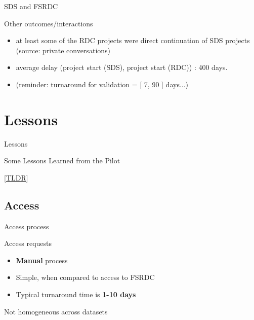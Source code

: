 \begin{frame}{SDS and FSRDC}
\begin{block}{Other outcomes/interactions}
\begin{itemize}
	\item at least some of the RDC projects were
direct continuation of SDS projects%
 (source: private conversations)
	\item average delay (project start (SDS), project start (RDC)) : 400 days.
	\item (reminder:  turnaround for validation = [ 7, 90 ]  days...)
\end{itemize}
\end{block}
\end{frame}





\section{Lessons}

\begin{frame}{Lessons}
\vfill
    \begin{block}{Some Lessons Learned from the Pilot}
        
    \end{block}
    \vfill
    \hfill \tiny \color{gray} [\hyperlink{sec:pilot:summary}{TLDR}]
\end{frame}

\subsection{Access}

\begin{frame}{Access process}
\scalebox{0.1}{\myworkflow}
\begin{block}{Access requests}
\begin{itemize}
	\item \textbf{Manual} process
	\item Simple, when compared to access to FSRDC
	\item Typical turnaround time is \textbf{1-10 days}
\end{itemize}
\tiny Not homogeneous across datasets
\end{block}
\end{frame}

